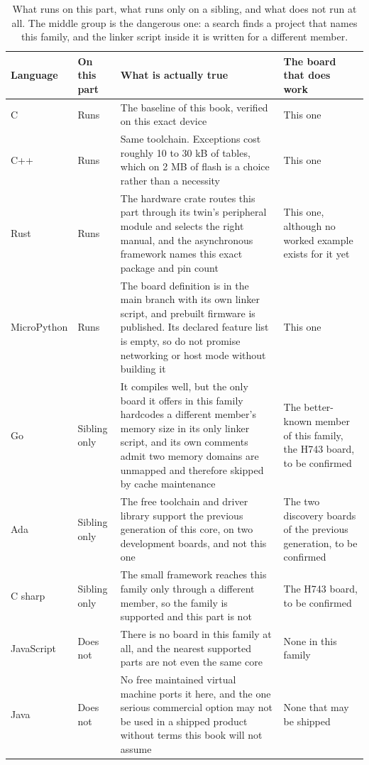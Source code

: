 \begin{table}[H]\centering\small
\begin{tabular}{p{26mm}p{22mm}p{54mm}p{42mm}}
\toprule
Language & On this part & What is actually true & The board that does work \\
\midrule
C & Runs & The baseline of this book, verified on this exact device & This one \\
C++ & Runs & Same toolchain. Exceptions cost roughly 10 to 30 kB of tables, which on 2 MB of flash is a choice rather than a necessity & This one \\
Rust & Runs & The hardware crate routes this part through its twin's peripheral module and selects the right manual, and the asynchronous framework names this exact package and pin count & This one, although no worked example exists for it yet \\
MicroPython & Runs & The board definition is in the main branch with its own linker script, and prebuilt firmware is published. Its declared feature list is empty, so do not promise networking or host mode without building it & This one \\
Go & Sibling only & It compiles well, but the only board it offers in this family hardcodes a different member's memory size in its only linker script, and its own comments admit two memory domains are unmapped and therefore skipped by cache maintenance & The better-known member of this family, the H743 board, to be confirmed \\
Ada & Sibling only & The free toolchain and driver library support the previous generation of this core, on two development boards, and not this one & The two discovery boards of the previous generation, to be confirmed \\
C sharp & Sibling only & The small framework reaches this family only through a different member, so the family is supported and this part is not & The H743 board, to be confirmed \\
JavaScript & Does not & There is no board in this family at all, and the nearest supported parts are not even the same core & None in this family \\
Java & Does not & No free maintained virtual machine ports it here, and the one serious commercial option may not be used in a shipped product without terms this book will not assume & None that may be shipped \\
\bottomrule
\end{tabular}
\caption{What runs on this part, what runs only on a sibling, and what does not run at all. The middle group is the dangerous one: a search finds a project that names this family, and the linker script inside it is written for a different member.}
\end{table}

